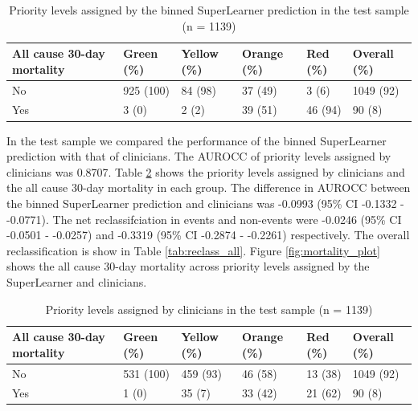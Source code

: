\documentclass[10pt,letterpaper]{article}\usepackage[]{graphicx}\usepackage[]{color}
\begin{document}
\begin{table}[ht]
\centering
\caption{Priority levels assigned by the binned SuperLearner prediction in the test sample (n = 1139)} 
\label{tab:superlearner_priorities_test}
\begin{tabular}{llllll}
  \hline
All cause 30-day mortality & Green (\%) & Yellow (\%) & Orange (\%) & Red (\%) & Overall (\%) \\ 
  \hline
No & 925 (100) & 84 (98) & 37 (49) & 3 (6) & 1049 (92) \\ 
  Yes & 3 (0) & 2 (2) & 39 (51) & 46 (94) & 90 (8) \\ 
   \hline
\end{tabular}
\end{table}


In the test sample we compared the performance of the binned SuperLearner
prediction with that of clinicians. The AUROCC of priority levels assigned by
clinicians was 0.8707. Table \ref{tab:clinicians_priorities_test}
shows the priority levels assigned by clinicians and the all cause 30-day
mortality in each group. The difference in AUROCC between the binned
SuperLearner prediction and clinicians was
-0.0993 (95\% CI -0.1332 - -0.0771). The net reclassifciation in events and
non-events were -0.0246 (95\% CI -0.0501 - -0.0257) and -0.3319 (95\% CI -0.2874 - -0.2261) respectively. The overall
reclassification is show in Table \ref{tab:reclass_all}. Figure
\ref{fig:mortality_plot} shows the all cause 30-day mortality across priority
levels assigned by the SuperLearner and clinicians.

\begin{table}[ht]
\centering
\caption{Priority levels assigned by clinicians in the test sample (n = 1139)} 
\label{tab:clinicians_priorities_test}
\begin{tabular}{llllll}
  \hline
All cause 30-day mortality & Green (\%) & Yellow (\%) & Orange (\%) & Red (\%) & Overall (\%) \\ 
  \hline
No & 531 (100) & 459 (93) & 46 (58) & 13 (38) & 1049 (92) \\ 
  Yes & 1 (0) & 35 (7) & 33 (42) & 21 (62) & 90 (8) \\ 
   \hline
\end{tabular}
\end{table}
\end{document}
